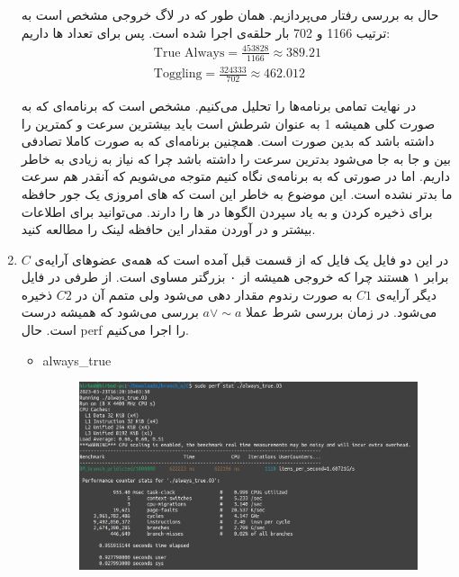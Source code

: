 \begin{enumerate}
    حال به بررسی رفتار  می‌پردازیم.
    همان طور که در لاگ خروجی  مشخص است به ترتیب
    1166 و 702
    بار حلقه‌ی 
    اجرا شده است. پس برای تعداد ها داریم:
    \begin{gather*}
        \text{True Always} = \frac{453828}{1166} \approx 389.21\\
        \text{Toggling} = \frac{324333}{702} \approx 462.012
    \end{gather*}
    
    در نهایت تمامی برنامه‌ها را تحلیل می‌کنیم. مشخص است که برنامه‌ای که به صورت کلی همیشه 1 به عنوان شرطش
    است باید بیشترین سرعت و کمترین  را داشته باشد که بدین صورت است. همچنین
    برنامه‌ای که به صورت کاملا تصادفی بین  و  جا به جا می‌شود بدترین سرعت را داشته باشد
    چرا که نیاز به  زیادی به خاطر  داریم.
    اما در صورتی که به برنامه‌ی  نگاه کنیم متوجه می‌شویم که آنقدر هم سرعت ما بدتر نشده است.
    این موضوع به خاطر این است که های امروزی یک جور حافظه برای
    ذخیره کردن و به یاد سپردن الگو‌ها در ها را دارند.
    می‌توانید برای اطلاعات بیشتر و در آوردن مقدار این حافظه
    لینک را مطالعه کنید.
    \item در این دو فایل یک فایل که از قسمت قبل آمده است که همه‌ی عضو‌های آرایه‌ی $C$ برابر ۱ هستند
    چرا که خروجی  همیشه از ۰ بزرگتر مساوی است. از طرفی در فایل دیگر آرایه‌ی $C1$
    به صورت رندوم مقدار دهی می‌شود ولی متمم آن در $C2$
    ذخیره می‌شود. در زمان بررسی شرط عملا
    $a \vee \sim a$
    بررسی می‌شود که همیشه درست است. حال perf را اجرا می‌کنیم.
    \begin{latin}
    \begin{itemize}
        \item always\_true
        \begin{figure}[H]
            \centerline{\includegraphics[scale=0.35]{pics/5/C/always_true.png}}

\end{figure}
\end{itemize}
\end{latin}
\end{enumerate}
